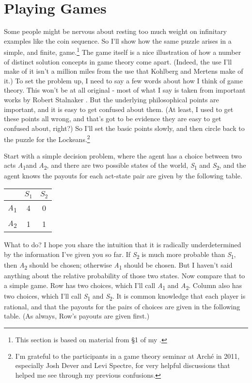 \documentclass[
  11pt,
]{book}
\begin{document}
\hypertarget{lockegames}{%
\section{Playing Games}\label{lockegames}}

Some people might be nervous about resting too much weight on infinitary examples like the coin sequence. So I'll show how the same puzzle arises in a simple, and finite, game.\footnote{This section is based on material from §1 of my \citeyearpar{Weatherson2016}.} The game itself is a nice illustration of how a number of distinct solution concepts in game theory come apart. (Indeed, the use I'll make of it isn't a million miles from the use that Kohlberg and Mertens \citeyearpar{KohlbergMertens1986} make of it.) To set the problem up, I need to say a few words about how I think of game theory. This won't be at all original - most of what I say is taken from important works by Robert Stalnaker \citetext{\citeyear{Stalnaker1994}; \citeyear{Stalnaker1996}; \citeyear{Stalnaker1998}; \citeyear{Stalnaker1999}}. But the underlying philosophical points are important, and it is easy to get confused about them. (At least, I used to get these points all wrong, and that's got to be evidence they are easy to get confused about, right?) So I'll set the basic points slowly, and then circle back to the puzzle for the Lockeans.\footnote{I'm grateful to the participants in a game theory seminar at Arché in 2011, especially Josh Dever and Levi Spectre, for very helpful discussions that helped me see through my previous confusions.}

Start with a simple decision problem, where the agent has a choice between two acts \emph{A}\textsubscript{1}and \emph{A}\textsubscript{2}, and there are two possible states of the world, \emph{S}\textsubscript{1} and \emph{S}\textsubscript{2}, and the agent knows the payouts for each act-state pair are given by the following table.

\begin{longtable}[]{@{}lcc@{}}
\toprule\noalign{}
& \(S_1\) & \(S_2\) \\
\midrule\noalign{}
\endhead
\bottomrule\noalign{}
\endlastfoot
\emph{A}\textsubscript{1} & 4 & 0 \\
\emph{A}\textsubscript{2} & 1 & 1 \\
\end{longtable}

What to do? I hope you share the intuition that it is radically underdetermined by the information I've given you so far. If \emph{S}\textsubscript{2} is much more probable than \emph{S}\textsubscript{1}, then \emph{A}\textsubscript{2} should be chosen; otherwise \emph{A}\textsubscript{1} should be chosen. But I haven't said anything about the relative probability of those two states. Now compare that to a simple game. Row has two choices, which I'll call \emph{A}\textsubscript{1} and \emph{A}\textsubscript{2}. Column also has two choices, which I'll call \emph{S}\textsubscript{1} and \emph{S}\textsubscript{2}. It is common knowledge that each player is rational, and that the payouts for the pairs of choices are given in the following table. (As always, Row's payouts are given first.)
\end{document}

